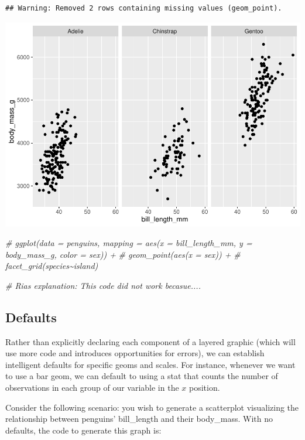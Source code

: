 \documentclass[
]{article}
\newenvironment{Shaded}{\begin{snugshade}}{\end{snugshade}}
\newcommand{\CommentTok}[1]{\textcolor[rgb]{0.56,0.35,0.01}{\textit{#1}}}
\begin{document}
\begin{verbatim}
## Warning: Removed 2 rows containing missing values (geom_point).
\end{verbatim}

\includegraphics{Grammar-of-Graphics_files/figure-latex/facet-1-1.pdf}

\begin{Shaded}
\begin{Highlighting}[]
\CommentTok{\# ggplot(data = penguins, mapping = aes(x = bill\_length\_mm, y = body\_mass\_g, color = sex)) +}
\CommentTok{\#   geom\_point(aes(x = sex)) +}
\CommentTok{\#   facet\_grid(species\textasciitilde{}island)}

\CommentTok{\# Ria\textquotesingle{}s explanation: This code did not work becasue....}
\end{Highlighting}
\end{Shaded}

\hypertarget{defaults}{%
\subsection{Defaults}\label{defaults}}

Rather than explicitly declaring each component of a layered graphic
(which will use more code and introduces opportunities for errors), we
can establish intelligent defaults for specific geoms and scales. For
instance, whenever we want to use a bar geom, we can default to using a
stat that counts the number of observations in each group of our
variable in the \(x\) position.

Consider the following scenario: you wish to generate a scatterplot
visualizing the relationship between penguins' bill\_length and their
body\_mass. With no defaults, the code to generate this graph is:
\end{document}

